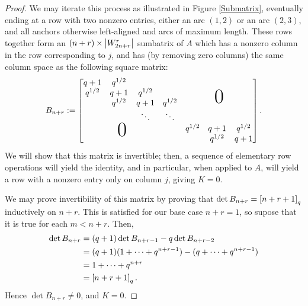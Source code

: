 \documentclass{amsart}
\begin{document}
\begin{proof}
  We may iterate this process as illustrated in Figure \ref{Submatrix}, eventually ending at a row with two nonzero entries, either an arc $(1,2)$ or an arc $(2,3)$, and all anchors otherwise left-aligned and arcs of maximum length.
  These rows together form an $(n + r) \times \left| W_{2n + r}^r \right|$ sumbatrix of $A$ which has a nonzero column in the row corresponding to $j$, and has (by removing zero columns) the same column space as the following square matrix:
  \newcommand*\bigzero{\makebox(0,15){\text{\Huge0}}}
  \newcommand*\bigzerotwo{\makebox(-20,15){\text{\Huge0}}}
  \[
    B_{n + r} := \begin{bmatrix}
      \begin{matrix}
      q + 1 & q^{1/2} & \\
      q^{1/2} & q + 1 & q^{1/2}\\
      & q^{1/2} & q + 1 & q^{1/2}\\
      &  & \ddots & \ddots
      \end{matrix}
      &   \bigzero\\
      \bigzerotwo & \begin{matrix}
        q^{1/2} & q+1 & q^{1/2}\\
        &  q^{1/2} & q + 1
       \end{matrix}
    \end{bmatrix}.
  \]
  We will show that this matrix is invertible;
  then, a sequence of elementary row operations will yield the identity, and in particular, when applied to $A$, will yield a row with a nonzero entry only on column $j$, giving $K = 0$.

  We may prove invertibility of this matrix by proving that $\det B_{n + r} = \left[ n + r + 1 \right]_q$ inductively on $n+r$.
  This is satisfied for our base case $n + r = 1$, so supose that it is true for each $m < n + r$.
  Then,
  \begin{align*}
    \det B_{n+r} &= (q + 1) \det B_{n + r - 1} - q \det B_{n + r - 2}\\
    &= (q + 1)(1 + \dots + q^{n + r - 1}) - (q + \dots + q^{n + r - 1})\\
    &= 1 + \dots + q^{n + r}\\
    &= \left[ n + r + 1 \right]_q.
  \end{align*}
  Hence $\det B_{n + r} \neq 0$, and $K = 0$.
\end{proof}
\end{document}
